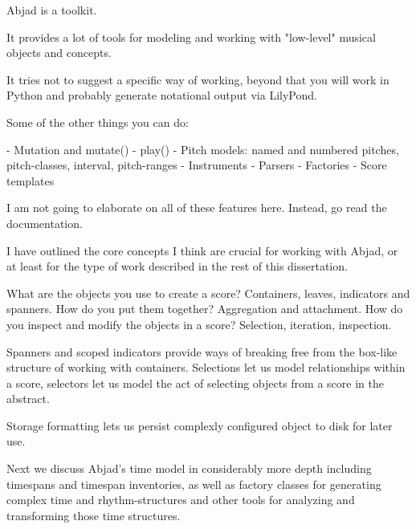 Abjad is a toolkit.

It provides a lot of tools for modeling and working with "low-level" musical
objects and concepts.

It tries not to suggest a specific way of working, beyond that you will work in
Python and probably generate notational output via LilyPond.

Some of the other things you can do:

-   Mutation and mutate()
-   play()
-   Pitch models: named and numbered pitches, pitch-classes, interval,
    pitch-ranges
-   Instruments
-   Parsers
-   Factories
-   Score templates

I am not going to elaborate on all of these features here. Instead, go read the
documentation.

I have outlined the core concepts I think are crucial for working with Abjad,
or at least for the type of work described in the rest of this dissertation.

What are the objects you use to create a score? Containers, leaves, indicators
and spanners. How do you put them together? Aggregation and attachment. How do
you inspect and modify the objects in a score? Selection, iteration,
inspection.

Spanners and scoped indicators provide ways of breaking free from the box-like
structure of working with containers. Selections let us model relationships
within a score, selectors let us model the act of selecting objects from a
score in the abstract.

Storage formatting lets us persist complexly configured object to disk for
later use.

Next we discuss Abjad's time model in considerably more depth including
timespans and timespan inventories, as well as factory classes for generating
complex time and rhythm-structures and other tools for analyzing and
transforming those time structures.

